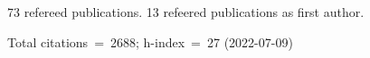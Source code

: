 73 refereed publications. 13 refeered publications as first author.

Total citations~=~2688; h-index~=~27 (2022-07-09)